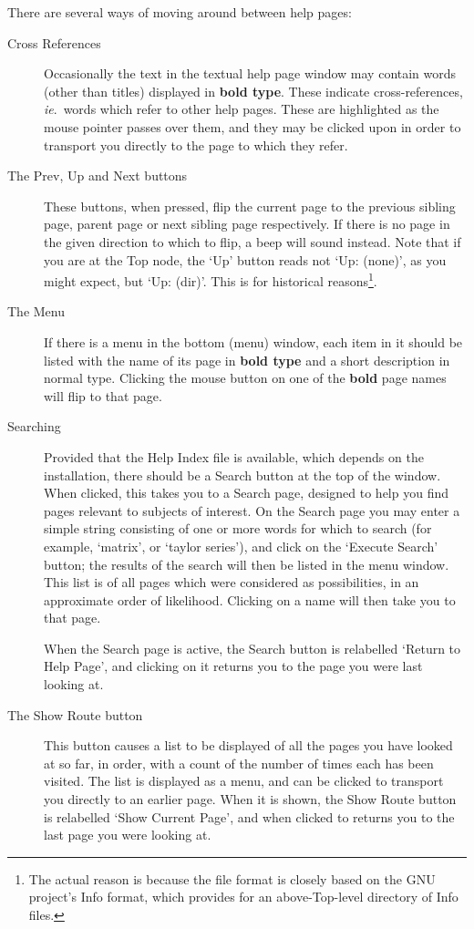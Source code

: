 There are several ways of moving around between help pages:

\begin{description}
\item[Cross References] Occasionally the text in the textual help page
window may contain words (other than titles) displayed in {\bf bold
type}.  These indicate cross-references, {\it ie\/}.~words which refer
to other help pages.  These are highlighted as the mouse pointer
passes over them, and they may be clicked upon in order to transport
you directly to the page to which they refer.

\item[The Prev, Up and Next buttons] These buttons, when pressed, flip
the current page to the previous sibling page, parent page or next
sibling page respectively.  If there is no page in the given direction
to which to flip, a beep will sound instead.  Note that if you are at
the Top node, the `Up' button reads not `Up: (none)', as you might
expect, but `Up: (dir)'.  This is for historical reasons\footnote{The
actual reason is because the file format is closely based on the GNU
project's Info format, which provides for an above-Top-level directory
of Info files.}.

\item[The Menu] If there is a menu in the bottom (menu) window, each
item in it should be listed with the name of its page in {\bf bold
type} and a short description in normal type.  Clicking the mouse
button on one of the {\bf bold} page names will flip to that page.

\item[Searching] Provided that the Help Index file is available, which
depends on the installation, there should be a Search button at the
top of the window.  When clicked, this takes you to a Search page,
designed to help you find pages relevant to subjects of interest.  On
the Search page you may enter a simple string consisting of one or
more words for which to search (for example, `matrix', or `taylor
series'), and click on the `Execute Search' button; the results of the
search will then be listed in the menu window.  This list is of all
pages which were considered as possibilities, in an approximate order
of likelihood.  Clicking on a name will then take you to that page.

When the Search page is active, the Search button is relabelled
`Return to Help Page', and clicking on it returns you to the page you
were last looking at.

\item[The Show Route button] This button causes a list to be displayed
of all the pages you have looked at so far, in order, with a count of
the number of times each has been visited.  The list is displayed as a
menu, and can be clicked to transport you directly to an earlier page.
When it is shown, the Show Route button is relabelled `Show Current
Page', and when clicked to returns you to the last page you were
looking at.
\end{description}


